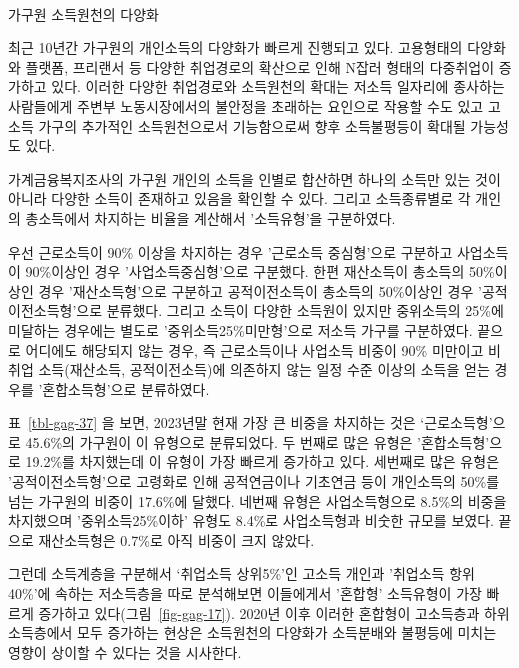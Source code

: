 \documentclass[
  letterpaper,
  DIV=11,
  numbers=noendperiod]{scrartcl}
\makeatletter
\let\oldparagraph\paragraph
\renewcommand{\paragraph}{
    \@ifstar
      \xxxParagraphStar
      \xxxParagraphNoStar
  }
\newcommand{\xxxParagraphStar}[1]{\oldparagraph*{#1}\mbox{}}
\newcommand{\xxxParagraphNoStar}[1]{\oldparagraph{#1}\mbox{}}
\makeatother
\begin{document}
\paragraph{가구원 소득원천의
다양화}\label{uxac00uxad6cuxc6d0-uxc18cuxb4dduxc6d0uxcc9cuxc758-uxb2e4uxc591uxd654}

최근 10년간 가구원의 개인소득의 다양화가 빠르게 진행되고 있다.
고용형태의 다양화와 플랫폼, 프리랜서 등 다양한 취업경로의 확산으로 인해
N잡러 형태의 다중취업이 증가하고 있다. 이러한 다양한 취업경로와
소득원천의 확대는 저소득 일자리에 종사하는 사람들에게 주변부
노동시장에서의 불안정을 초래하는 요인으로 작용할 수도 있고 고소득 가구의
추가적인 소득원천으로서 기능함으로써 향후 소득불평등이 확대될 가능성도
있다.

가계금융복지조사의 가구원 개인의 소득을 인별로 합산하면 하나의 소득만
있는 것이 아니라 다양한 소득이 존재하고 있음을 확인할 수 있다. 그리고
소득종류별로 각 개인의 총소득에서 차지하는 비율을 계산해서 '소득유형'을
구분하였다.

우선 근로소득이 90\% 이상을 차지하는 경우 '근로소득 중심형'으로 구분하고
사업소득이 90\%이상인 경우 '사업소득중심형'으로 구분했다. 한편
재산소득이 총소득의 50\%이상인 경우 '재산소득형'으로 구분하고
공적이전소득이 총소득의 50\%이상인 경우 '공적이전소득형'으로 분류했다.
그리고 소득이 다양한 소득원이 있지만 중위소득의 25\%에 미달하는 경우에는
별도로 '중위소득25\%미만형'으로 저소득 가구를 구분하였다. 끝으로
어디에도 해당되지 않는 경우, 즉 근로소득이나 사업소득 비중이 90\%
미만이고 비취업 소득(재산소득, 공적이전소득)에 의존하지 않는 일정 수준
이상의 소득을 얻는 경우를 '혼합소득형'으로 분류하였다.

표~\ref{tbl-gag-37} 을 보면, 2023년말 현재 가장 큰 비중을 차지하는 것은
`근로소득형'으로 45.6\%의 가구원이 이 유형으로 분류되었다. 두 번째로
많은 유형은 '혼합소득형'으로 19.2\%를 차지했는데 이 유형이 가장 빠르게
증가하고 있다. 세번째로 많은 유형은 '공적이전소득형'으로 고령화로 인해
공적연금이나 기초연금 등이 개인소득의 50\%를 넘는 가구원의 비중이
17.6\%에 달했다. 네번째 유형은 사업소득형으로 8.5\%의 비중을 차지했으며
'중위소득25\%이하' 유형도 8.4\%로 사업소득형과 비숫한 규모를 보였다.
끝으로 재산소득형은 0.7\%로 아직 비중이 크지 않았다.

그런데 소득계층을 구분해서 `취업소득 상위5\%'인 고소득 개인과 '취업소득
항위40\%'에 속하는 저소득층을 따로 분석해보면 이들에게서 '혼합형'
소득유형이 가장 빠르게 증가하고 있다(그림~\ref{fig-gag-17}). 2020년 이후
이러한 혼합형이 고소득층과 하위소득층에서 모두 증가하는 현상은
소득원천의 다양화가 소득분배와 불평등에 미치는 영향이 상이할 수 있다는
것을 시사한다.
\end{document}
